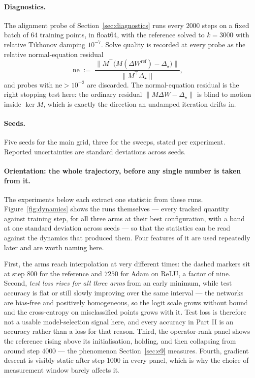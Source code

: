\documentclass{article} %
\theoremstyle{plain}
\theoremstyle{definition}
\theoremstyle{remark}
\begin{document}
\paragraph{Diagnostics.} The alignment probe of Section~\ref{sec:diagnostics} runs every $2000$
steps on a fixed batch of $64$ training points, in float64, with the reference solved to $k = 3000$
with relative Tikhonov damping $10^{-7}$. Solve quality is recorded at every probe as the relative
normal-equation residual
\begin{equation}
  \mathrm{ne} \;:=\; \frac{\big\|M^\top\big(M(\Delta W^{\mathrm{ref}}) - \Delta_\star\big)\big\|}
                          {\big\|M^\top \Delta_\star\big\|},
  \label{eq:ne}
\end{equation}
and probes with $\mathrm{ne} > 10^{-2}$ are discarded. The normal-equation residual is the right
stopping test here: the ordinary residual $\|M\Delta W - \Delta_\star\|$ is blind to motion inside
$\ker M$, which is exactly the direction an undamped iteration drifts in.

\paragraph{Seeds.} Five seeds for the main grid, three for the sweeps, stated per experiment.
Reported uncertainties are standard deviations across seeds.

\paragraph{Orientation: the whole trajectory, before any single number is taken from it.}
The experiments below each extract one statistic from these runs. Figure~\ref{fig:dynamics} shows
the runs themselves --- every tracked quantity against training step, for all three arms at their
best configuration, with a band at one standard deviation across seeds --- so that the statistics
can be read against the dynamics that produced them. Four features of it are used repeatedly later
and are worth naming here.

First, the arms reach interpolation at very different times: the dashed markers sit at step $800$
for the reference and $7250$ for Adam on ReLU, a factor of nine. Second, \emph{test loss rises for
all three arms} from an early minimum, while test accuracy is flat or still slowly improving over
the same interval --- the networks are bias-free and positively homogeneous, so the logit scale
grows without bound and the cross-entropy on misclassified points grows with it. Test loss is
therefore not a usable model-selection signal here, and every accuracy in Part II is an accuracy
rather than a loss for that reason. Third, the operator-rank panel shows the reference rising above
its initialisation, holding, and then collapsing from around step $4000$ --- the phenomenon
Section~\ref{sec:e9} measures. Fourth, gradient descent is visibly static after step $1000$ in
every panel, which is why the choice of measurement window barely affects it.
\end{document}
